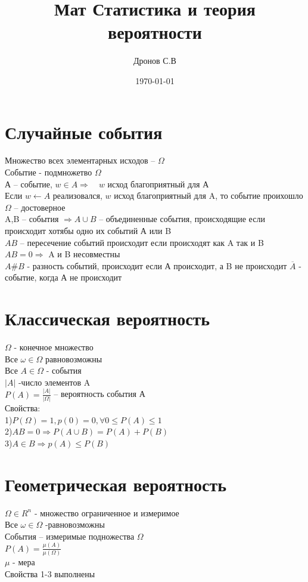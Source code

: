 \documentclass[a4paper, 12pt]{article}
\title{Мат Статистика и теория вероятности}
\author{Дронов С.В}
\date{\today}
\begin{document}
\sffamily
\maketitle
\section{Случайные события}
Множество всех элементарных исходов -- $ \Omega $\\
Событие - подмножетво $ \Omega $  \\
А -- событие, $ w \in A  \Rightarrow \quad w$  исход благоприятный для А\\
Если $ w \leftarrow A $ реализовался, $ w $ исход благоприятный для A, то событие проихошло\\
$ \Omega $  -- достоверное\\
A,B -- события $ \Rightarrow A\cup B $ -- объединенные события, происходящие если происходит хотябы одно их событий А или B\\
$ AB $  -- пересечение событий происходит если происходят как A так и B\\
$ AB = 0 \Rightarrow$  A и B несовместны\\
$ A\#B $ - разность событий, происходит если А происходит, а B не происходит
$ \overline{A} $ - событие, когда А не происходит 
\section{Классическая вероятность}
$ \Omega $  - конечное множество\\
Все $ \omega \in \Omega $  равновозможны\\
Все $ A \in \Omega $ - события\\
$ |A| $ -число элементов A\\
$ P(A) = \frac{|A|}{|\Omega|} $ -- вероятность события А\\

Свойства:\\
1)$ P(\Omega) = 1, p(0) = 0, \forall  0 \leq P(A) \leq 1 $ \\
2)$ AB = 0 \Rightarrow P(A\cup B) = P(A) + P(B) $ \\
3)$ A \in B \Rightarrow p(A) \leq P(B) $ \\

\section{Геометрическая вероятность}
$ \Omega \in R^n $  - множество ограниченное и измеримое\\
Все $ \omega \in \Omega $  -равновозможны\\
События -- измеримые подножества $ \Omega $ \\
$ P(A) = \frac{\mu(A)}{\mu(\Omega)} $\\
$ \mu  $   - мера\\
Свойства 1-3 выполнены\\
\end{document}
